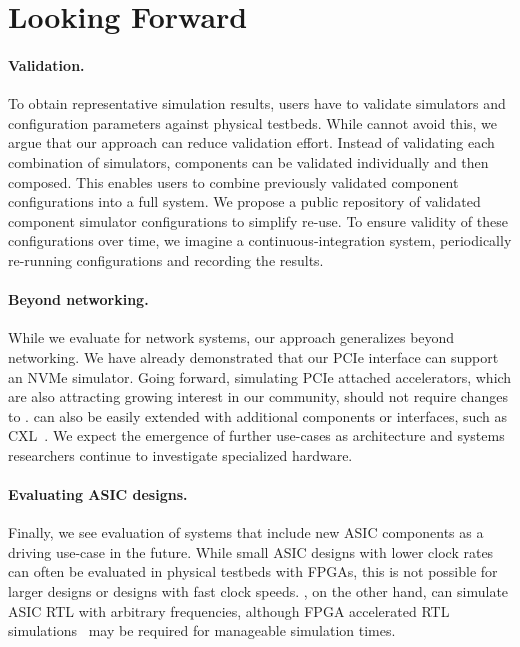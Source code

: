 \section{Looking Forward}
\label{sec:discussion}

\paragraph{Validation.}
To obtain representative simulation results, users have to
validate simulators and configuration parameters against physical
testbeds.
%
While \sysname cannot avoid this, we argue that our approach can
reduce validation effort.
%
Instead of validating each combination of simulators, components can
be validated individually and then composed.
%
This enables users to combine previously validated component
configurations into a full system.
%
We propose a public repository of validated component simulator
configurations to simplify re-use.
%
To ensure validity of these configurations over time, we imagine a
continuous-integration system, periodically re-running configurations and
recording the results.


\paragraph{Beyond networking.}
While we evaluate \sysname for network systems, our approach
generalizes beyond networking.
%
We have already demonstrated that our PCIe interface can support an
NVMe simulator.
%
Going forward, simulating PCIe attached accelerators, which are also
attracting growing interest in our community, should not require
changes to \sysname.
%
\sysname can also be easily extended with additional components or
interfaces, such as CXL~\cite{spec:cxl}.
%
We expect the emergence of further use-cases as architecture and
systems researchers continue to investigate specialized hardware.


\paragraph{Evaluating ASIC designs.}
Finally, we see evaluation of systems that include new ASIC components
as a driving use-case in the future.
%
While small ASIC designs with lower clock rates can often be evaluated
in physical testbeds with FPGAs, this is not possible for larger
designs or designs with fast clock speeds.
%
\sysname, on the other hand, can simulate ASIC RTL with arbitrary
frequencies, although FPGA accelerated RTL
simulations~\cite{karandikar:firesim} may be required for manageable
simulation times.
